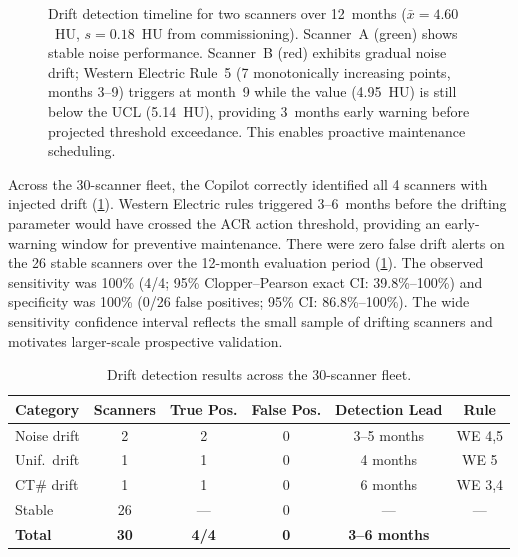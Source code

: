 \documentclass[11pt]{article}
\begin{document}
\begin{figure}[t]
\caption{%
  Drift detection timeline for two scanners over 12~months
  ($\bar{x}=4.60$~HU, $s=0.18$~HU from commissioning).
  Scanner~A (green) shows stable noise performance.
  Scanner~B (red) exhibits gradual noise drift; Western Electric
  Rule~5 (7 monotonically increasing points, months 3--9)
  triggers at month~9 while the value (4.95~HU) is still below
  the UCL (5.14~HU), providing 3~months early warning before
  projected threshold exceedance.
  This enables proactive maintenance scheduling.
}
\label{fig:drift_timeline}
\end{figure}

Across the 30-scanner fleet, the Copilot correctly identified all
4 scanners with injected drift (\cref{fig:drift_timeline}).
Western Electric rules triggered 3--6~months before the drifting
parameter would have crossed the ACR action threshold, providing
an early-warning window for preventive maintenance.
There were zero false drift alerts on the 26 stable scanners
over the 12-month evaluation period (\cref{tab:drift_results}).
The observed sensitivity was 100\% (4/4; 95\% Clopper--Pearson
exact CI: 39.8\%--100\%) and specificity was 100\% (0/26 false
positives; 95\% CI: 86.8\%--100\%).
The wide sensitivity confidence interval reflects the small sample
of drifting scanners and motivates larger-scale prospective
validation.

\begin{table}[t]
\centering
\caption{Drift detection results across the 30-scanner fleet.}
\label{tab:drift_results}
\small
\begin{tabular}{@{}lccccc@{}}
\toprule
Category & Scanners & True Pos. & False Pos. & Detection Lead & Rule \\
\midrule
Noise drift    & 2 & 2 & 0 & 3--5 months & WE 4,5 \\
Unif.\ drift   & 1 & 1 & 0 & 4 months    & WE 5 \\
CT\# drift     & 1 & 1 & 0 & 6 months    & WE 3,4 \\
Stable         & 26 & --- & 0 & --- & --- \\
\midrule
\textbf{Total} & \textbf{30} & \textbf{4/4} & \textbf{0} & \textbf{3--6 months} & \\
\bottomrule
\end{tabular}
\end{table}
\end{document}
